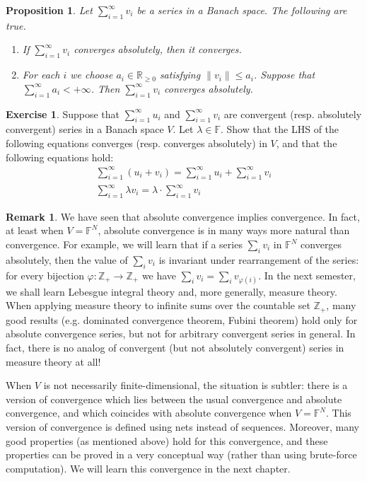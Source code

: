 \documentclass[12pt,b5paper,notitlepage]{article}
\theoremstyle{definition}
\newtheorem{exe}[df]{Exercise}
\newtheorem{rem}[df]{Remark}
\theoremstyle{plain}
\newtheorem{pp}[df]{Proposition}
\newcommand{\Zbb}{\mathbb Z}
\newcommand{\Rbb}{\mathbb R}
\newcommand{\Fbb}{\mathbb F}
\numberwithin{equation}{section}
\begin{document}
\begin{pp}
Let $\sum_{i=1}^\infty v_i$ be a series in a Banach space. The following are true.
\begin{enumerate}
\item If $\sum_{i=1}^\infty v_i$ converges absolutely, then it converges.
\item For each $i$ we choose $a_i\in\Rbb_{\geq0}$ satisfying $\lVert v_i\lVert\leq a_i$. Suppose that $\sum_{i=1}^\infty a_i<+\infty$. Then $\sum_{i=1}^\infty v_i$ converges absolutely.
\end{enumerate}
\end{pp}


\begin{exe}
Suppose that $\sum_{i=1}^\infty u_i$ and $\sum_{i=1}^\infty v_i$ are convergent (resp. absolutely convergent) series in a Banach space $V$. Let $\lambda\in\Fbb$. Show that the LHS of the following equations converges (resp. converges absolutely) in $V$, and that the following equations hold:
\begin{gather*}
\sum_{i=1}^\infty (u_i+v_i)=\sum_{i=1}^\infty u_i+\sum_{i=1}^\infty v_i\\
\sum_{i=1}^\infty \lambda v_i=\lambda\cdot\sum_{i=1}^\infty v_i
\end{gather*}
\end{exe}


\begin{rem}
We have seen that absolute convergence implies convergence. In fact, at least when $V=\Fbb^N$, absolute convergence is in many ways more natural than convergence. For example, we will learn that if a series $\sum_i v_i$ in $\Fbb^N$ converges absolutely, then the value of $\sum_i v_i$ is invariant under rearrangement of the series: for every bijection $\varphi:\Zbb_+\rightarrow\Zbb_+$ we have $\sum_i v_i=\sum_i v_{\varphi(i)}$. In the next semester, we shall learn Lebesgue integral theory and, more generally, measure theory. When applying measure theory to infinite sums over the countable set $\Zbb_+$, many good results (e.g. dominated convergence theorem, Fubini theorem)  hold only for absolute convergence series, but not for arbitrary convergent series in general. In fact, there is no analog of convergent (but not absolutely convergent) series in measure theory at all!

When $V$ is not necessarily finite-dimensional, the situation is subtler: there is a version of convergence which lies between the usual convergence and absolute convergence, and which coincides with absolute convergence when $V=\Fbb^N$. This version of convergence is defined using nets instead of sequences. Moreover, many good properties (as mentioned above) hold for this convergence, and these properties can be proved in a very conceptual way (rather than using brute-force computation). We will learn this convergence in the next chapter.   \hfill\qedsymbol
\end{rem}
\end{document}
